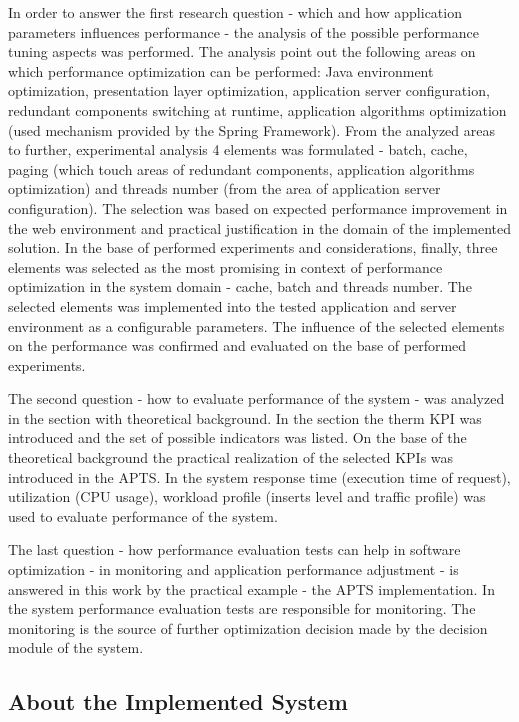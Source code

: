 \documentclass[10pt,a4paper]{article}
\begin{document}
In order to answer the first research question - which and how application parameters influences performance - the analysis of the possible performance tuning aspects was performed. The analysis point out the following areas on which performance optimization can be performed: Java environment optimization, presentation layer optimization, application server configuration, redundant components switching at runtime, application algorithms  optimization (used mechanism provided by the Spring Framework). From the analyzed areas to further, experimental analysis 4 elements was formulated - batch, cache, paging (which touch areas of redundant components, application algorithms optimization) and threads number (from the area of application server configuration). The selection was based on expected performance improvement in the web environment and practical justification in the domain of the implemented solution. In the base of performed experiments and considerations, finally, three elements was selected as the most promising in context of performance optimization in the system domain - cache, batch and threads number. The selected elements was implemented into the tested application and server environment as a configurable parameters. The influence of the selected elements on the performance was confirmed and evaluated on the base of performed experiments. 

The second question - how to evaluate performance of the system - was analyzed in the section with theoretical background. In the section the therm KPI was introduced and the set of possible indicators was listed. On the base of the theoretical background the practical realization of the selected KPIs was introduced in the APTS. In the system response time (execution time of request), utilization (CPU usage), workload profile (inserts level and traffic profile) was used to evaluate performance of the system.

The last question - how performance evaluation tests can help in software optimization - in monitoring and application performance adjustment - is answered in this work by the practical example - the APTS implementation. In the system performance evaluation tests are responsible for monitoring. The monitoring is the source of further optimization decision made by the decision module of the system.  


\subsection{About the Implemented System}
\end{document}
